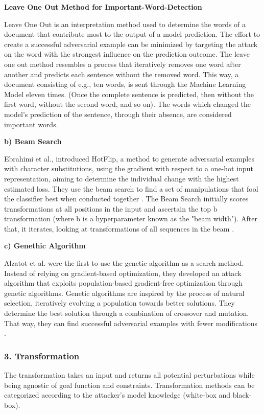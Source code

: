         \textbf{Leave One Out Method for Important-Word-Detection}
        

Leave One Out is an interpretation method used to determine the words of a document that contribute most to the output of a model prediction. The effort to create a successful adversarial example can be minimized by targeting the attack on the word with the strongest influence on the prediction outcome. The leave one out method resembles a process that iteratively removes one word after another and predicts each sentence without the removed word. 
This way, a document consisting of e.g., ten words, is sent through the Machine Learning Model eleven times. (Once the complete sentence is predicted, then without the first word, without the second word, and so on). The words which changed the model's prediction of the sentence, through their absence, are considered important words. 
        
    \textbf{b) Beam Search}
    
        Ebrahimi et al., introduced HotFlip, a method to generate adversarial examples with character substitutions, using the gradient with respect to a one-hot input representation, aiming to determine the individual change with the highest estimated loss. They use the beam search to find a set of manipulations that fool the classifier best when conducted together \cite{ebrahimi2017hotflip}. The Beam Search initially scores transformations at all positions in the input and ascertain the top b transformation (where b is a hyperparameter known as the "beam width"). After that, it iterates, looking at transformations of all sequences in the beam \cite{tillmann2003word}. 
        
    \textbf{c) Genethic Algorithm}
    
        Alzatot et al. were the first to use the genetic algorithm as a search method. Instead of relying on gradient-based optimization, they developed an attack algorithm that exploits population-based gradient-free optimization through genetic algorithms. Genetic algorithms are inspired by the process of natural selection, iteratively evolving a population towards better solutions. They determine the best solution through a combination of crossover and mutation. That way, they can find successful adversarial examples with fewer modifications \cite{alzantot2018generating}.
        
        
\subsubsection{3. Transformation}
    The transformation takes an input and returns all potential perturbations while being agnostic of goal function and constraints. Transformation methods can be categorized according to the attacker's model knowledge (white-box and black-box).

